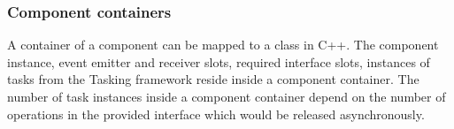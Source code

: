 \subsubsection{\textbf{Component containers}}
A container of a component can be mapped to a class in C++. The component instance, event emitter and receiver slots, required interface slots, instances of tasks from the Tasking framework reside inside a component container. The number of task instances inside a component container depend on the number of operations in the provided interface which would be released asynchronously. 

 
   



 


 

